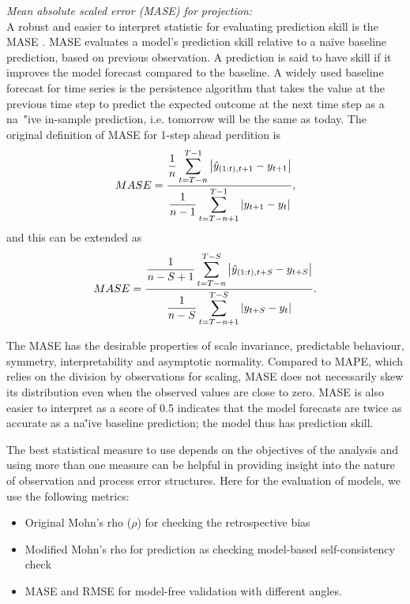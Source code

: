 \vspace{0.2cm} \noindent
{\it Mean absolute scaled error (MASE) for projection:}\\ 
A robust and easier to interpret statistic for evaluating prediction skill is the MASE \citep{hyndman2006another}. MASE evaluates a model's prediction skill relative to a na\" {i}ve baseline prediction, based on previous observation. A prediction is said to have skill if it improves the model forecast compared to the baseline. A widely used baseline forecast for time series is the persistence algorithm that takes the value at the previous time step to predict the expected outcome at the next time step as a na\ "{i}ve in-sample prediction, i.e. tomorrow will be the same as today. The original definition of MASE for 1-step ahead perdition is 
\begin{equation}
{MASE=\frac{\displaystyle\frac{1}{n} \sum_{t=T-n}^{T-1} \left| \hat{y}_{(1:t),t+1}-y_{t+1} \right|}
{\displaystyle\frac{1}{n-1} \sum_{t=T-n+1}^{T-1} \left|y_{t+1}-y_{t}\right|}}, 
\end{equation}
and this can be extended as 
\begin{equation}
MASE=
\frac{\displaystyle \frac{1}{n-S+1} \sum_{t=T-n}^{T-S}  \left| \hat{y}_{(1:t),t+S}-y_{t+S} \right|}
{\displaystyle \frac{1}{n-S} \sum_{t=T-n+1}^{T-S} \left|y_{t+S}-y_{t}\right|}. 
\end{equation} 

The MASE has the desirable properties of scale invariance, predictable behaviour, symmetry, interpretability and asymptotic normality. Compared to MAPE, which relies on the division by observations for scaling, MASE does not necessarily skew its distribution even when the observed values are close to zero. MASE is also easier to interpret as a score of 0.5 indicates that the model forecasts are twice as accurate as a na\''{i}ve baseline prediction; the model thus has prediction skill.
\vspace{0.2cm}

The best statistical measure to use depends on the objectives of the analysis and using more than one measure can be helpful in providing insight into the nature of observation and process error structures. Here for the evaluation of models, we use the following metrics: 
\begin{itemize}
\item Original Mohn's rho ($\rho$) for checking the retrospective bias \\
\vspace{-0.3cm}
\item Modified Mohn's rho for prediction  as checking model-based self-consistency check \\
\vspace{-0.3cm}
\item MASE and RMSE for model-free validation with different angles. 
\end{itemize}


